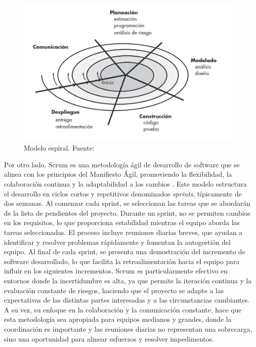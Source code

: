 \begin{figure}[!htb]
    \centering
    \includegraphics[width=\linewidth]{Figures/model-spiral.png}
    \caption{Modelo espiral. Fuente: \cite{pressman2010ingenieria}}
\end{figure}

Por otro lado, Scrum es una metodología ágil de desarrollo de software que se alinea con los principios del Manifiesto Ágil, promoviendo la flexibilidad, la colaboración continua y la adaptabilidad a los cambios \cite{pressman2010ingenieria}. Este modelo estructura el desarrollo en ciclos cortos y repetitivos denominados \textit{sprints}, típicamente de dos semanas. Al comenzar cada sprint, se seleccionan las tareas que se abordarán de la lista de pendientes del proyecto. Durante un sprint, no se permiten cambios en los requisitos, lo que proporciona estabilidad mientras el equipo aborda las tareas seleccionadas. El proceso incluye reuniones diarias breves, que ayudan a identificar y resolver problemas rápidamente y fomentan la autogestión del equipo. Al final de cada sprint, se presenta una demostración del incremento de software desarrollado, lo que facilita la retroalimentación hacia el equipo para influir en los siguientes incrementos. Scrum es particularmente efectivo en entornos donde la incertidumbre es alta, ya que permite la iteración continua y la evaluación constante de riesgos, haciendo que el proyecto se adapte a las expectativas de las distintas partes interesadas y a las circunstancias cambiantes. A su vez, su enfoque en la colaboración y la comunicación constante, hace que esta metodología sea apropiada para equipos medianos y grandes, donde la coordinación es importante y las reuniones diarias no representan una sobrecarga, sino una oportunidad para alinear esfuerzos y resolver impedimentos.

